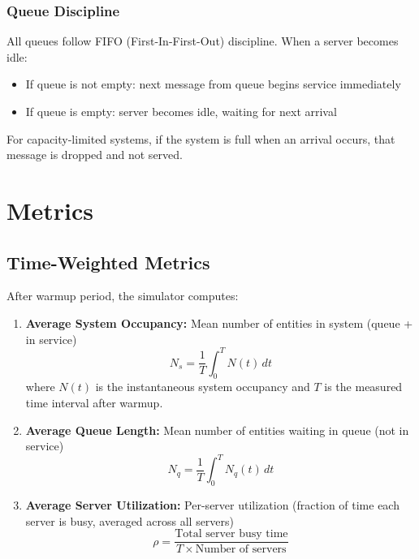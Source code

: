 \documentclass[12pt]{article}
\begin{document}
\subsubsection{Queue Discipline}

All queues follow FIFO (First-In-First-Out) discipline. When a server becomes idle:
\begin{itemize}
    \item If queue is not empty: next message from queue begins service immediately
    \item If queue is empty: server becomes idle, waiting for next arrival
\end{itemize}

For capacity-limited systems, if the system is full when an arrival occurs, that message is dropped and not served.

\section{Metrics}

\subsection{Time-Weighted Metrics}

After warmup period, the simulator computes:

\begin{enumerate}
    \item \textbf{Average System Occupancy:} Mean number of entities in system (queue + in service)
          \begin{equation}
              N_s = \frac{1}{T} \int_0^T N(t) \, dt
          \end{equation}
          where $N(t)$ is the instantaneous system occupancy and $T$ is the measured time interval after warmup.

    \item \textbf{Average Queue Length:} Mean number of entities waiting in queue (not in service)
          \begin{equation}
              N_q = \frac{1}{T} \int_0^T N_q(t) \, dt
          \end{equation}

    \item \textbf{Average Server Utilization:} Per-server utilization (fraction of time each server is busy, averaged across all servers)
          \begin{equation}
              \rho = \frac{\text{Total server busy time}}{T \times \text{Number of servers}}
          \end{equation}
\end{enumerate}
\end{document}
